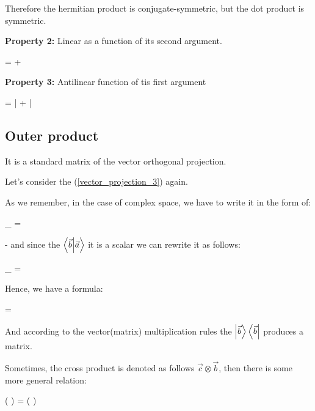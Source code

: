 \documentclass{article}
\begin{document}
Therefore the hermitian product is conjugate-symmetric, but the dot product is symmetric.


\textbf{Property 2:} Linear as a function of its second argument. 

\beq \label{inner_prod_similinear}
  = \alpha {} + \beta {}
\eeq

\textbf{Property 3:} Antilinear function of tis first argument

\beq \label{inner_prod_antilinear}
  = \bar{\alpha} + \bar{\beta} 
\eeq


\subsection{Outer product}
It is a standard matrix of the vector orthogonal projection.

Let's consider the (\ref{vector_projection_3}) again.

As we remember, in the case of complex space, we have to write it in the form of:

\beq \label{vector_projection_4}
_{}  =  
\eeq

- and since the $\bra{\vec{b}}\ket{\vec{a}}$ it is a scalar we can rewrite it as follows:

\beq \label{vector_projection_5}
_{}  = 
\eeq

Hence, we have a formula:

\beq
{} = 
\eeq

And according to the vector(matrix) multiplication rules the $\ket{\vec{b}}\bra{\vec{b}}$ produces a matrix.

Sometimes, the cross product is denoted as follows $\vec{c} \otimes \vec{b}$, then there is some more general relation:

\beq \label{outer_product_dot_product}
\left(  \otimes {} \right) =  \left(  \cdot {} \right)
\eeq
\end{document}
